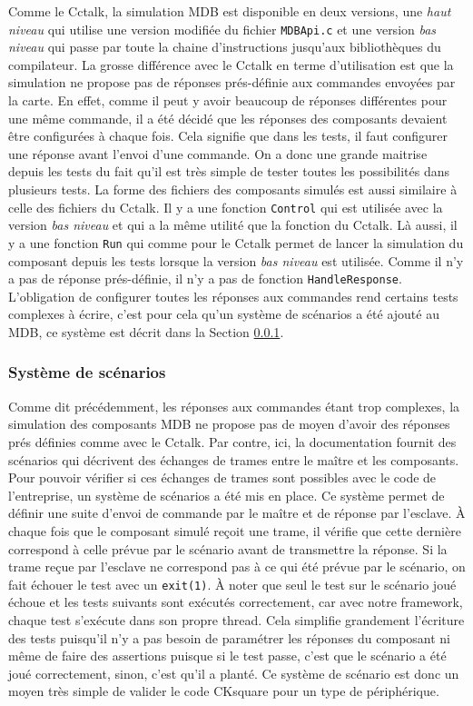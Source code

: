\documentclass[a4paper]{article}
\begin{document}
Comme le Cctalk, la simulation MDB est disponible en deux versions, une
\textit{haut niveau} qui utilise une version modifiée du fichier \verb|MDBApi.c|
et une version \textit{bas niveau} qui passe par toute la chaine d'instructions
jusqu'aux bibliothèques du compilateur. La grosse différence avec le Cctalk en
terme d'utilisation est que la simulation ne propose pas de réponses
prés-définie aux commandes envoyées par la carte. En effet, comme il peut y
avoir beaucoup de réponses différentes pour une même commande, il a été décidé
que les réponses des composants devaient être configurées à chaque fois. Cela
signifie que dans les tests, il faut configurer une réponse avant l'envoi d'une
commande. On a donc une grande maitrise depuis les tests du fait qu'il est très
simple de tester toutes les possibilités dans plusieurs tests. La forme des
fichiers des composants simulés est aussi similaire à celle des fichiers du
Cctalk. Il y a une fonction \verb|Control| qui est utilisée avec la version
\textit{bas niveau} et qui a la même utilité que la fonction du Cctalk. Là
aussi, il y a une fonction \verb|Run| qui comme pour le Cctalk permet de lancer
la simulation du composant depuis les tests lorsque la version \textit{bas
niveau} est utilisée. Comme il n'y a pas de réponse prés-définie, il n'y a pas
de fonction \verb|HandleResponse|. L'obligation de configurer toutes les
réponses aux commandes rend certains tests complexes à écrire, c'est pour cela
qu'un système de scénarios a été ajouté au MDB, ce système est décrit dans la
Section \ref{sysscenar}.

\subsubsection{Système de scénarios}
\label{sysscenar}

Comme dit précédemment, les réponses aux commandes étant trop complexes, la
simulation des composants MDB ne propose pas de moyen d'avoir des réponses prés
définies comme avec le Cctalk. Par contre, ici, la documentation fournit des
scénarios qui décrivent des échanges de trames entre le maître et les
composants. Pour pouvoir vérifier si ces échanges de trames sont possibles avec
le code de l'entreprise, un système de scénarios a été mis en place. Ce système
permet de définir une suite d'envoi de commande par le maître et de réponse par
l'esclave. À chaque fois que le composant simulé reçoit une trame, il vérifie
que cette dernière correspond à celle prévue par le scénario avant de
transmettre la réponse. Si la trame reçue par l'esclave ne correspond pas à ce
qui été prévue par le scénario, on fait échouer le test avec un \verb|exit(1)|.
À noter que seul le test sur le scénario joué échoue et les tests suivants sont
exécutés correctement, car avec notre framework, chaque test s'exécute dans son
propre thread. Cela simplifie grandement l'écriture des tests puisqu'il n'y a
pas besoin de paramétrer les réponses du composant ni même de faire des
assertions puisque si le test passe, c'est que le scénario a été joué
correctement, sinon, c'est qu'il a planté. Ce système de scénario est donc un
moyen très simple de valider le code CKsquare pour un type de périphérique.
\end{document}
